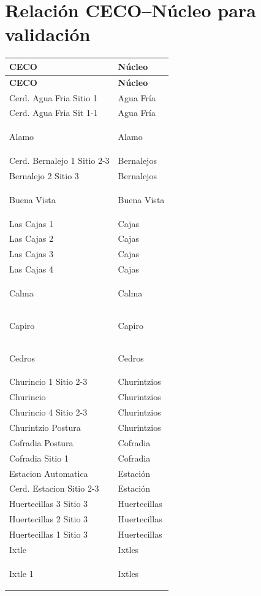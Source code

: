 \documentclass[11pt]{article}
\newcommand{\corregido}[1]{\colorbox{red!25}{\strut #1}}
\newcommand{\incorporado}[1]{\colorbox{green!25}{\strut #1}}
\begin{document}
\section*{Relación CECO--Núcleo para validación}

\setlength\LTleft{\fill}
\setlength\LTright{\fill}
\begin{longtable}{@{}p{7cm}p{7cm}@{}}
\toprule
\textbf{CECO} & \textbf{Núcleo} \\
\midrule
\endfirsthead
\toprule
\textbf{CECO} & \textbf{Núcleo} \\
\midrule
\endhead
\bottomrule
\endfoot
Cerd. Agua Fria Sitio 1 & Agua Fría \\
Cerd. Agua Fria Sit 1-1 & Agua Fría \\
\incorporado{Alamo} & \incorporado{Alamo} \\
Cerd. Bernalejo 1 Sitio 2-3 & Bernalejos \\
Bernalejo 2 Sitio 3 & Bernalejos \\
\incorporado{Buena Vista} & \incorporado{Buena Vista} \\
Las Cajas 1 & Cajas \\
Las Cajas 2 & Cajas \\
Las Cajas 3 & Cajas \\
Las Cajas 4 & Cajas \\
\incorporado{Calma} & \incorporado{Calma} \\
\incorporado{Capiro} & \incorporado{Capiro} \\
\incorporado{Cedros} & \incorporado{Cedros} \\
Churincio 1 Sitio 2-3 & Churintzios \\
Churincio & Churintzios \\
Churincio 4 Sitio 2-3 & Churintzios \\
Churintzio Postura & Churintzios \\
Cofradia Postura & Cofradia \\
Cofradia Sitio 1 & Cofradia \\
Estacion Automatica & Estación \\
Cerd. Estacion Sitio 2-3 & Estación \\
Huertecillas 3 Sitio 3 & Huertecillas \\
Huertecillas 2 Sitio 3 & Huertecillas \\
Huertecillas 1 Sitio 3 & Huertecillas \\
Ixtle & Ixtles \\
\corregido{Ixtle 1} & \corregido{Ixtles} \\

\end{longtable}
\end{document}
